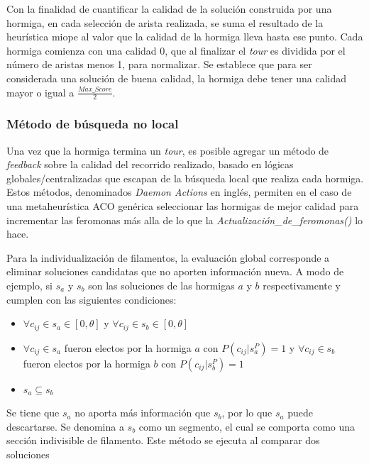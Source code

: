 Con la finalidad de cuantificar la calidad de la soluci\'on construida por una hormiga, en cada selecci\'on de arista realizada, se suma el resultado de la heur\'istica miope al valor que la calidad de la hormiga lleva hasta ese punto. Cada hormiga comienza con una calidad 0, que al finalizar el {\it tour} es dividida por el n\'umero de aristas menos 1, para normalizar. Se establece que para ser considerada una soluci\'on de buena calidad, la hormiga debe tener una calidad mayor o igual a $\frac{Max\_Score}{2}$.
    
\subsubsection{M\'etodo de b\'usqueda no local}
Una vez que la hormiga termina un {\it tour}, es posible agregar un m\'etodo de {\it feedback} sobre la calidad del recorrido realizado, basado en l\'ogicas globales/centralizadas que escapan de la b\'usqueda local que realiza cada hormiga. Estos m\'etodos, denominados {\it Daemon Actions} en ingl\'es, permiten en el caso de una metaheur\'istica ACO gen\'erica seleccionar las hormigas de mejor calidad para incrementar las feromonas m\'as alla de lo que la {\it Actualizaci\'on\_de\_feromonas()} lo hace. 

Para la individualizaci\'on de filamentos, la evaluaci\'on global corresponde a eliminar soluciones candidatas que no aporten informaci\'on nueva. A modo de ejemplo, si $s_a$ y $s_b$ son las soluciones de las hormigas $a$ y $b$ respectivamente y cumplen con las siguientes condiciones:

\begin{itemize}
    \item $\forall c_{ij} \in s_a \in [0, \theta]$ y $\forall c_{ij} \in s_b \in [0, \theta]$
    \item $\forall c_{ij} \in s_a$ fueron electos por la hormiga $a$ con $P(c_{ij} | s_{a}^{P}) = 1$ y $\forall c_{ij} \in s_b$ fueron electos por la hormiga $b$ con $P(c_{ij} | s_{b}^{P}) = 1$
    \item $s_a \subseteq s_b$
\end{itemize}

Se tiene que $s_a$ no aporta m\'as informaci\'on que $s_b$, por lo que $s_a$ puede descartarse. Se denomina a $s_b$ como un segmento, el cual se comporta como una secci\'on indivisible de filamento. Este m\'etodo se ejecuta al comparar dos soluciones 

    
